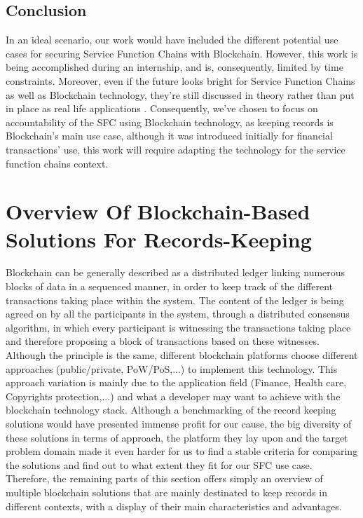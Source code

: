 \subsection{Conclusion}
In an ideal scenario, our work would have included the different potential use cases for securing Service Function Chains with Blockchain. However, this work is being accomplished during an internship, and is, consequently, limited by time constraints. Moreover, even if the future looks bright for Service Function Chains as well as Blockchain technology, they're still discussed in theory rather than put in place as real life applications \cite{sfc} \cite{btc}. Consequently, we've chosen to focus on accountability of the SFC using Blockchain technology, as keeping records is Blockchain's main use case, although it was introduced initially for financial transactions' use, this work will require adapting the technology for the service function chains context.
\newpage
\section{Overview Of Blockchain-Based Solutions For Records-Keeping}
Blockchain can be generally described as a distributed ledger linking numerous blocks of data in a sequenced manner, in order to keep track of the different transactions taking place within the system. The content of the ledger is being agreed on by all the participants in the system, through a distributed consensus algorithm, in which every participant is witnessing the transactions taking place and therefore proposing a block of transactions based on these witnesses. Although the principle is the same, different blockchain platforms choose different approaches (public/private, PoW/PoS,...) to implement this technology. This approach variation is mainly due to the application field (Finance, Health care, Copyrights protection,...) and what a developer may want to achieve with the blockchain technology stack. Although a benchmarking of the record keeping solutions would have presented immense profit for our cause, the big diversity of these solutions in terms of approach, the platform they lay upon and the target problem domain made it even harder for us to find a stable criteria for comparing the solutions and find out to what extent they fit for our SFC use case. Therefore, the remaining parts of this section offers simply an overview of multiple blockchain solutions that are mainly destinated to keep records in different contexts, with a display of their main characteristics and advantages.  
